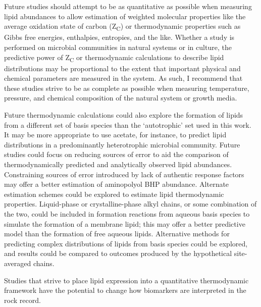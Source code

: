 

Future studies should attempt to be as quantitative as possible when measuring lipid abundances to allow estimation of weighted molecular properties like the average oxidation state of carbon (Z\textsubscript{C}) or thermodynamic properties such as Gibbs free energies, enthalpies, entropies, and the like. Whether a study is performed on microbial communities in natural systems or in culture, the predictive power of Z\textsubscript{C} or thermodynamic calculations to describe lipid distributions may be proportional to the extent that important physical and chemical parameters are measured in the system. As such, I recommend that these studies strive to be as complete as possible when measuring temperature, pressure, and chemical composition of the natural system or growth media.

Future thermodynamic calculations could also explore the formation of lipids from a different set of basis species than the `autotrophic' set used in this work. It may be more appropriate to use acetate, for instance, to predict lipid distributions in a predominantly heterotrophic microbial community. Future studies could focus on reducing sources of error to aid the comparison of thermodynamically predicted and analytically observed lipid abundances. Constraining sources of error introduced by lack of authentic response factors may offer a better estimation of aminopolyol BHP abundance. Alternate estimation schemes could be explored to estimate lipid thermodynamic properties. Liquid-phase or crystalline-phase alkyl chains, or some combination of the two, could be included in formation reactions from aqueous basis species to simulate the formation of a membrane lipid; this may offer a better predictive model than the formation of free aqueous lipids. Alternative methods for predicting complex distributions of lipids from basis species could be explored, and results could be compared to outcomes produced by the hypothetical site-averaged chains.

Studies that strive to place lipid expression into a quantitative thermodynamic framework have the potential to change how biomarkers are interpreted in the rock record.

